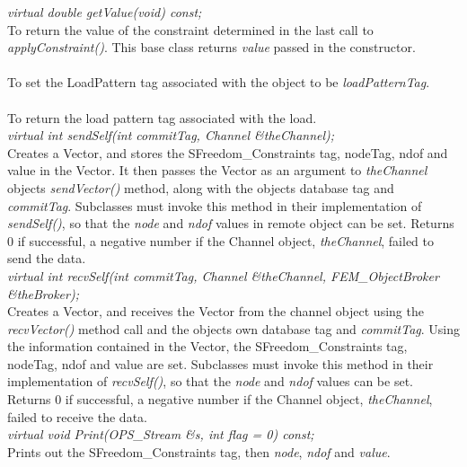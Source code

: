 {\em virtual double getValue(void) const;} \\
To return the value of the constraint determined in the last call to
{\em applyConstraint()}. This base class returns {\em value} passed in
the constructor.  \\ 

\\
To set the LoadPattern tag associated with the object to be {\em
loadPatternTag}. \\

\\ 
To return the load pattern tag associated with the load. \\

{\em virtual int sendSelf(int commitTag, Channel \&theChannel);} \\ 
Creates a Vector, and stores the SFreedom\_Constraints tag, nodeTag, ndof and value in
the Vector. It then passes the Vector as an argument to {\em
theChannel} objects {\em sendVector()} method, along with the objects 
database tag and {\em commitTag}. Subclasses must invoke this method
in their implementation of {\em sendSelf()}, so that the {\em node}
and {\em ndof} values in remote object can be set. Returns $0$ if
successful, a negative number if the Channel object, {\em theChannel},
failed to send the data. \\ 

{\em virtual int recvSelf(int commitTag, Channel \&theChannel, FEM\_ObjectBroker
\&theBroker);} \\ 
Creates a Vector, and receives the Vector from the channel object
using the {\em recvVector()} method call and the objects own database
tag and {\em commitTag}. Using the information contained in the Vector, the 
SFreedom\_Constraints tag, nodeTag, ndof and value are set. Subclasses must
invoke this method in their implementation of {\em recvSelf()}, so
that the {\em node} and {\em ndof} values can be set. Returns $0$ if
successful, a negative number if the Channel object, {\em
theChannel}, failed to receive the data. \\   

{\em virtual void Print(OPS_Stream \&s, int flag = 0) const;} \\
Prints out the SFreedom\_Constraints tag, then {\em node}, {\em ndof} and
{\em value}. 

